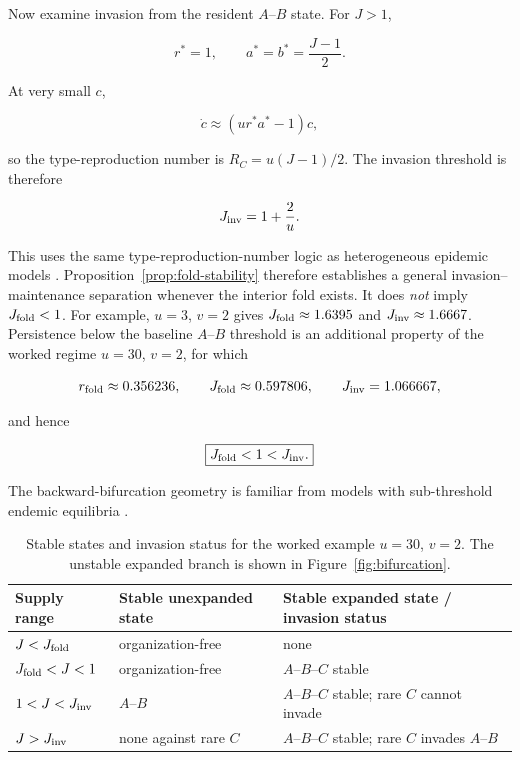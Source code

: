 \documentclass[11pt,a4paper]{article}
\begin{document}
Now examine invasion from the resident $A$--$B$ state. For $J>1$,

\[
r^*=1,
\qquad
a^*=b^*=\frac{J-1}{2}.
\]

At very small $c$,

\[
\dot c\approx(ur^*a^*-1)c,
\]

so the type-reproduction number is $R_C=u(J-1)/2$. The invasion threshold is therefore

\begin{equation}
J_{\rm inv}=1+\frac{2}{u}.
\label{eq:Jinv}
\end{equation}

This uses the same type-reproduction-number logic as heterogeneous epidemic models \citep{Heesterbeek2007}. Proposition~\ref{prop:fold-stability} therefore establishes a general invasion--maintenance separation whenever the interior fold exists. It does \emph{not} imply $J_{\rm fold}<1$. For example, $u=3$, $v=2$ gives $J_{\rm fold}\approx1.6395$ and $J_{\rm inv}\approx1.6667$. Persistence below the baseline $A$--$B$ threshold is an additional property of the worked regime $u=30$, $v=2$, for which

\[
r_{\rm fold}\approx0.356236,
\qquad
J_{\rm fold}\approx0.597806,
\qquad
J_{\rm inv}=1.066667,
\]

and hence

\[
\boxed{J_{\rm fold}<1<J_{\rm inv}.}
\]

The backward-bifurcation geometry is familiar from models with sub-threshold endemic equilibria \citep{KribsZaleta2000,VandenDriessche2002}.

\begin{table}[htbp]
\centering
\begin{tabular}{lll}
\toprule
Supply range & Stable unexpanded state & Stable expanded state / invasion status \\
\midrule
$J<J_{\rm fold}$ & organization-free & none \\
$J_{\rm fold}<J<1$ & organization-free & $A$--$B$--$C$ stable \\
$1<J<J_{\rm inv}$ & $A$--$B$ & $A$--$B$--$C$ stable; rare $C$ cannot invade \\
$J>J_{\rm inv}$ & none against rare $C$ & $A$--$B$--$C$ stable; rare $C$ invades $A$--$B$ \\
\bottomrule
\end{tabular}
\caption{Stable states and invasion status for the worked example $u=30$, $v=2$. The unstable expanded branch is shown in Figure~\ref{fig:bifurcation}.}
\label{tab:equilibria}
\end{table}
\end{document}

